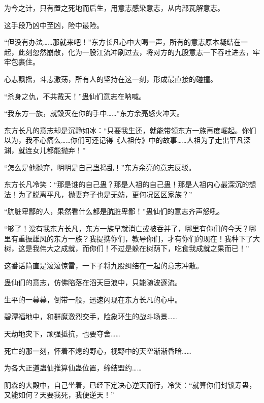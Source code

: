 \begin{this_body}
为今之计，只有置之死地而后生，用意志感染意志，从内部瓦解意志。

这手段乃凶中至凶，险中最险。

“但没有办法……那就来吧！”东方长凡心中大喝一声，所有的意志原本凝结在一起，此刻忽然崩散，化为一股江流冲刷过去，将对方的九股意志一下吞吐进去，牢牢包裹住。

心志飘摇，斗志激荡，所有人的坚持在这一刻，形成最直接的碰撞。

“杀身之仇，不共戴天！”蛊仙们意志在呐喊。

“我东方一族，就毁灭在你的手中……”东方余亮怒火冲天。

东方长凡的意志却是沉静如冰：“只要我生还，就能带领东方一族再度崛起。你们以为，我不心痛么……你们可还记得《人祖传》中的故事……人祖为了走出平凡深渊，就连女儿都能抛弃！”

“怎么是他抛弃，明明是自己蛊捣乱！”东方余亮的意志反驳。

东方长凡冷笑：“那是谁的自己蛊？那是人祖的自己蛊！那是人祖内心最深沉的想法！为了脱离平凡，抛妻弃子也是无妨，更何况区区家族？”

“肮脏卑鄙的人，果然看什么都是肮脏卑鄙！”蛊仙们的意志齐声怒吼。

“够了！没有我东方长凡，东方一族早就消亡或被吞并了，哪里有你们的今天？哪里有重振雄风的东方一族？我提携你们，教导你们，才有你们的现在！我种下了大树，这是我伟大之成就，而你们！不过是躲在树荫下，吃食我成就之果而已！”

这番话简直是滚滚惊雷，一下子将九股纠结在一起的意志冲散。

蛊仙们的意志，仿佛陷落在滔天巨浪中，只能随波逐流。

生平的一幕幕，倒带一般，迅速闪现在东方长凡的心中。

碧潭福地中，和群魔激烈交手，险象环生的战斗场景……

天劫地灾下，顽强抵抗，也要夺舍……

死亡的那一刻，怀着不熄的野心，视野中的天空渐渐昏暗……

为各大正道蛊仙推算仙蛊位置，缔结盟约……

阴森的大殿中，自己坐着，已经下定决心逆天而行，冷笑：“就算你们封锁寿蛊，又能如何？天要我死，我便逆天！”

\end{this_body}

